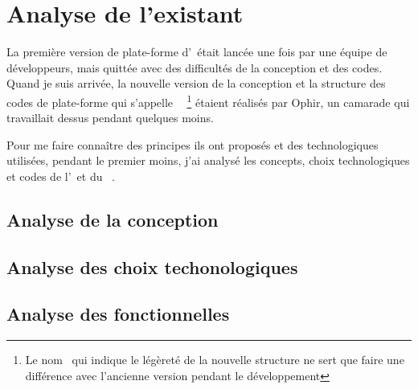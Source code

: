 \section{Analyse de l'existant}

La première version de plate-forme d’\ezb\ était lancée une fois par une équipe de développeurs, mais quittée avec des difficultés de la conception et des codes. Quand je suis arrivée, la nouvelle version de la conception et la structure des codes de plate-forme qui s'appelle \textbf{\mini\ } \footnote{Le nom \mini\ qui indique le légèreté de la nouvelle structure ne sert que faire une différence avec l'ancienne version pendant le développement} étaient réalisés par Ophir, un camarade qui travaillait dessus pendant quelques moins. 

Pour me faire connaître des principes ils ont proposés et des technologiques utilisées, pendant le premier moins, j’ai analysé les concepts, choix technologiques et codes de l'\ezb\ et du \mini\ .  

\subsection{Analyse de la conception}
\subsection{Analyse des choix techonologiques}
\subsection{Analyse des fonctionnelles}